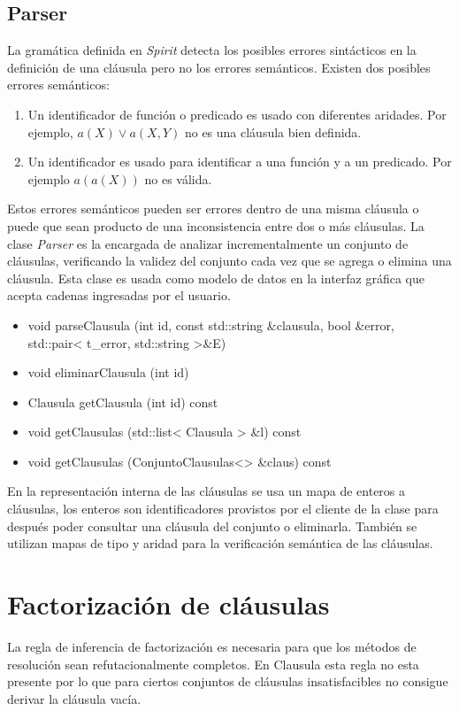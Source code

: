 \documentclass[a4paper,12pt]{article}
\begin{document}
\subsection{Parser}
La gramática definida en \emph{Spirit} detecta los posibles errores sintácticos en la definición
de una cláusula pero no los errores semánticos. Existen dos posibles errores semánticos:
\begin{enumerate}
\item Un identificador de función o predicado es usado con diferentes aridades. Por ejemplo, $a(X) \lor a(X,Y)$ no
es una cláusula bien definida.
\item Un identificador es usado para identificar a una función y a un predicado. Por ejemplo $a(a(X))$ no es válida.
\end{enumerate}
Estos errores semánticos pueden ser errores dentro de una misma cláusula o puede que sean producto de una
inconsistencia entre dos o más cláusulas. La clase \emph{Parser} es la encargada de analizar incrementalmente
un conjunto de cláusulas, verificando la validez del conjunto cada vez que se agrega o elimina una cláusula.
Esta clase es usada como modelo de datos en la interfaz gráfica que acepta cadenas ingresadas por el usuario.
\begin{itemize}
\renewcommand{\labelitemi}{$\bullet$}
\item void parseClausula (int id, const std::string \&clausula, bool \&error, std::pair< t\_error, std::string >\&E)
\item void eliminarClausula (int id)
\item Clausula getClausula (int id) const
\item void getClausulas (std::list< Clausula > \&l) const
\item void getClausulas (ConjuntoClausulas<> \&claus) const
\end{itemize}
En la representación interna de las cláusulas se usa un mapa de enteros a cláusulas, los enteros
son identificadores provistos por el cliente de la clase para después poder consultar una cláusula
del conjunto o eliminarla. También se utilizan mapas de tipo y aridad para la verificación semántica
de las cláusulas.
\section{Factorización de cláusulas}
La regla de inferencia de factorización\cite{PracticalLogic} es necesaria para que los métodos de
resolución sean refutacionalmente completos. En Clausula esta regla no esta presente por lo que
para ciertos conjuntos de cláusulas insatisfacibles no consigue derivar la cláusula vacía.
\end{document}
